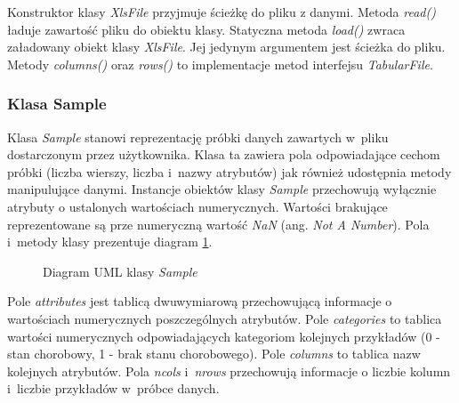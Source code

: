 \documentclass[../thesis.tex]{subfiles}
\begin{document}
Konstruktor klasy \emph{XlsFile} przyjmuje ścieżkę do pliku z danymi. Metoda \emph{read()} ładuje zawartość pliku do obiektu klasy. Statyczna metoda \emph{load()} zwraca załadowany obiekt klasy \emph{XlsFile}. Jej jedynym argumentem jest ścieżka do pliku. Metody \emph{columns()} oraz \emph{rows()} to implementacje metod interfejsu \emph{TabularFile}.

\subsubsection{Klasa Sample}

Klasa \emph{Sample} stanowi reprezentację próbki danych zawartych w~pliku dostarczonym przez użytkownika. Klasa ta zawiera pola odpowiadające cechom próbki (liczba wierszy, liczba i~nazwy atrybutów) jak również udostępnia metody manipulujące danymi. Instancje obiektów klasy \emph{Sample} przechowują wyłącznie atrybuty o ustalonych wartościach numerycznych. Wartości brakujące reprezentowane są prze numeryczną wartość \emph{NaN} (ang.\emph{ Not A Number}). Pola i~metody klasy prezentuje diagram \ref{proj:diagram_sample}.

\begin{figure}[h]
\centering
{}
\caption{Diagram UML klasy \emph{Sample}}
\label{proj:diagram_sample}
\end{figure}

Pole \emph{attributes} jest tablicą dwuwymiarową przechowującą informacje o wartościach numerycznych poszczególnych atrybutów. Pole \emph{categories} to tablica wartości numerycznych odpowiadających kategoriom kolejnych przykładów (0 - stan chorobowy, 1 - brak stanu chorobowego). Pole \emph{columns} to tablica nazw kolejnych atrybutów. Pola \emph{ncols} i~\emph{nrows} przechowują informacje o liczbie kolumn i~liczbie przykładów w~próbce danych.
\end{document}
